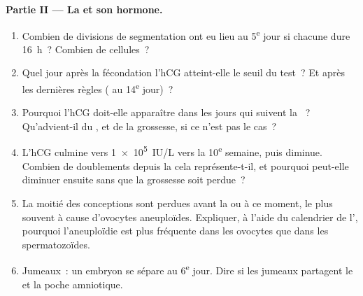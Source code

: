 \begin{problem}
\medskip
\noindent\textbf{Partie II --- La  et son hormone.}
\begin{enumerate}[resume]
  \item Combien de divisions de segmentation ont eu lieu au 5\textsuperscript{e}
        jour si chacune dure \qty{16}{h}~? Combien de cellules~?
  \item Quel jour après la fécondation l'hCG atteint-elle le seuil du
        test~? Et après les dernières règles ( au
        14\textsuperscript{e} jour)~?
  \item Pourquoi l'hCG doit-elle apparaître dans les jours qui suivent la
        ~? Qu'advient-il du , et de la grossesse, si
        ce n'est pas le cas~?
  \item L'hCG culmine vers \qty{1e5}{IU/L} vers la 10\textsuperscript{e}
        semaine, puis diminue. Combien de doublements depuis la 
        cela représente-t-il, et pourquoi peut-elle diminuer ensuite sans
        que la grossesse soit perdue~?
  \item La moitié des conceptions sont perdues avant la  ou à ce
        moment, le plus souvent à cause d'ovocytes aneuploïdes. Expliquer,
        à l'aide du calendrier de l', pourquoi l'aneuploïdie est
        plus fréquente dans les ovocytes que dans les spermatozoïdes.
  \item Jumeaux~: un embryon se sépare au 6\textsuperscript{e} jour.
        Dire si les jumeaux partagent le  et la poche amniotique.
\end{enumerate}


\end{problem}
